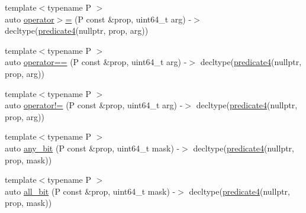 \begin{DoxyCompactItemize}
{\footnotesize template$<$typename P $>$ }\\auto \hyperlink{namespacepfq__lang_ac37c4aac9486ceca12814ccd9b4c3306}{operator$>$=} (P const \&prop, uint64\+\_\+t arg) -\/$>$ decltype(\hyperlink{namespacepfq__lang_a1a9064340f4197e3dd4109a849a224dc}{predicate4}(nullptr, prop, arg))
\item 
{\footnotesize template$<$typename P $>$ }\\auto \hyperlink{namespacepfq__lang_ac55d12423490f127fcb57b29535ca791}{operator==} (P const \&prop, uint64\+\_\+t arg) -\/$>$ decltype(\hyperlink{namespacepfq__lang_a1a9064340f4197e3dd4109a849a224dc}{predicate4}(nullptr, prop, arg))
\item 
{\footnotesize template$<$typename P $>$ }\\auto \hyperlink{namespacepfq__lang_a982f7b6137536d7e75fe9b2c13d581d4}{operator!=} (P const \&prop, uint64\+\_\+t arg) -\/$>$ decltype(\hyperlink{namespacepfq__lang_a1a9064340f4197e3dd4109a849a224dc}{predicate4}(nullptr, prop, arg))
\item 
{\footnotesize template$<$typename P $>$ }\\auto \hyperlink{namespacepfq__lang_a9e93958b1fecbd660154947b474ffd05}{any\+\_\+bit} (P const \&prop, uint64\+\_\+t mask) -\/$>$ decltype(\hyperlink{namespacepfq__lang_a1a9064340f4197e3dd4109a849a224dc}{predicate4}(nullptr, prop, mask))
\item 
{\footnotesize template$<$typename P $>$ }\\auto \hyperlink{namespacepfq__lang_a424b5bd6563ed52fd84807def8ba2f5f}{all\+\_\+bit} (P const \&prop, uint64\+\_\+t mask) -\/$>$ decltype(\hyperlink{namespacepfq__lang_a1a9064340f4197e3dd4109a849a224dc}{predicate4}(nullptr, prop, mask))
\end{DoxyCompactItemize}


